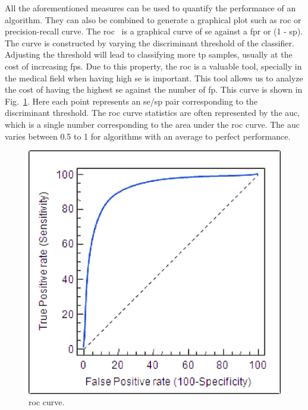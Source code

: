All the aforementioned measures can be used to quantify the performance of an algorithm.
They can also be combined to generate a graphical plot such as \acf{roc} or precision-recall curve.
The \ac{roc}~\cite{zweig1993receiver} is a graphical curve of \ac{se} against a \acf{fpr} or (1 - \ac{sp}).
The curve is constructed by varying the discriminant threshold of the classifier.
Adjusting the threshold will lead to classifying more \ac{tp} samples, usually at the cost of increasing \ac{fp}s.
Due to this property, the \ac{roc} is a valuable tool, specially in the medical field when having high \ac{se} is important.
This tool allows us to analyze the cost of having the highest \ac{se} against the number of \ac{fp}.
This curve is shown in Fig.~\ref{fig:roccurve}.
Here each point represents an \ac{se}/\ac{sp} pair corresponding to the discriminant threshold.
The \ac{roc} curve statistics are often represented by the \acf{auc}, which is a single number corresponding to the area under the \ac{roc} curve.
The \ac{auc} varies between 0.5 to 1 for algorithms with an average to perfect performance.

\begin{figure}
\begin{center}
\includegraphics[scale=1]{Chapter2/Figures/roccurve2}
\end{center}
\caption[\ac{roc} curve]{\ac{roc} curve.}
\label{fig:roccurve}
\end{figure}



